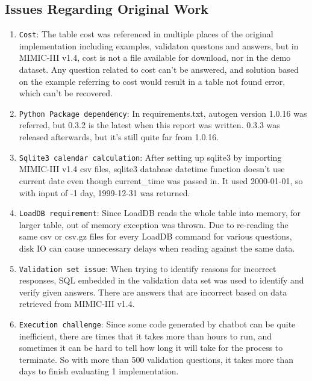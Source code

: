 \documentclass[acmsmall]{acmart}
\begin{document}
\subsection{Issues Regarding Original Work}
\begin{enumerate}
  \item{\texttt{Cost}}: The table cost was referenced in multiple places of the original implementation including examples, 
  validaton questons and answers, but in MIMIC-III v1.4, cost is not a file available for download, nor in the demo dataset. 
  Any question related to cost can't be answered, and solution based on the example referring to cost would result in 
  a table not found error, which can't be recovered.
  \item{\texttt{Python Package dependency}}: In requirements.txt, autogen version 1.0.16 was referred, but 0.3.2 is the latest 
  when this report was written. 0.3.3 was released afterwards, but it's still quite far from 1.0.16.
  \item{\texttt{Sqlite3 calendar calculation}}: After setting up sqlite3 by importing MIMIC-III v1.4 csv files, 
  sqlite3 database datetime function doesn't use current date even though current\_time was passed in. 
  It used 2000-01-01, so with input of -1 day, 1999-12-31 was returned.
  \item{\texttt{LoadDB requirement}}: Since LoadDB reads the whole table into memory, for larger table, 
  out of memory exception was thrown. Due to re-reading the same csv or csv.gz files for every LoadDB command
  for various questions, disk IO can cause unnecessary delays when reading against the same data.
  \item{\texttt{Validation set issue}}: When trying to identify reasons for incorrect responses, SQL embedded in the validation
  data set was used to identify and verify given answers. There are answers that are incorrect based on data retrieved from MIMIC-III v1.4. 
  \item{\texttt{Execution challenge}}: Since some code generated by chatbot can be quite inefficient, there are times that it 
  takes more than hours to run, and sometimes it can be hard to tell how long it will take for the process to terminate. 
  So with more than 500 validation questions, it takes more than days to finish evaluating 1 implementation.
\end{enumerate}
\end{document}
